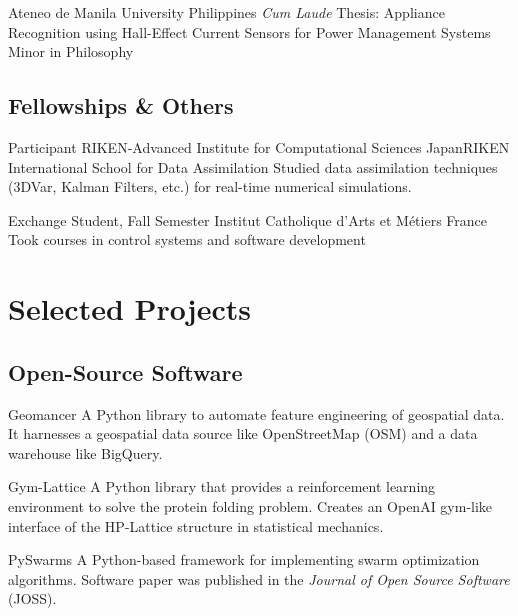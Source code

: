 \documentclass[12pt,a4paper]{moderncv}
\begin{document}
{Ateneo de Manila University}
{Philippines}
{\textit{Cum Laude}}
{
    Thesis: Appliance Recognition using Hall-Effect Current Sensors for
    Power Management Systems\\
    Minor in Philosophy
}


\subsection{Fellowships \& Others}

{Participant}
{RIKEN-Advanced Institute for Computational Sciences}
{Japan}{RIKEN International School for Data Assimilation}
{Studied data assimilation techniques (3DVar, Kalman Filters, etc.) for real-time numerical simulations.}

{Exchange Student, Fall Semester}
{Institut Catholique d'Arts et M\'etiers}
{France}{}
{Took courses in control systems and software development}

\section{Selected Projects}

\subsection{Open-Source Software}


{\color{blue}
    }
{Geomancer}{}{}
{
    A Python library to automate feature engineering of geospatial data. It
    harnesses a geospatial data source like OpenStreetMap (OSM) and a data
    warehouse like BigQuery.
}

{\color{blue} }
{Gym-Lattice}{}{}
{
    A Python library that provides a reinforcement learning environment
    to solve the protein folding problem. Creates an OpenAI gym-like
    interface of the HP-Lattice structure in statistical mechanics.
}

{\color{blue} }
{PySwarms}{}{}
{
    A Python-based framework for implementing swarm optimization
    algorithms. Software paper was published in the \textit{Journal of Open
        Source Software} (JOSS).
}
\end{document}

